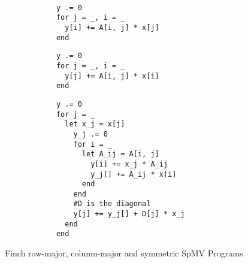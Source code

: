 \begin{wrapfigure}{r}{0.41\linewidth}
    \vspace{-36pt}
    \begin{minipage}[t]{0.18\textwidth}
        \begin{verbatim}
        
            y .= 0
            for j = _, i = _
              y[i] += A[i, j] * x[j]
            end
        \end{verbatim}
        \vspace{24pt} %
        \begin{verbatim}
            y .= 0
            for j = _, i = _
              y[j] += A[i, j] * x[i]
            end
        \end{verbatim}
    \end{minipage}\hfill%
    \begin{minipage}[t]{0.22\textwidth}
        \vspace{0pt} %
        \begin{verbatim}
            y .= 0
            for j = _
              let x_j = x[j]
                y_j .= 0
                for i = _
                  let A_ij = A[i, j]
                    y[i] += x_j * A_ij
                    y_j[] += A_ij * x[i]
                  end
                end
                #D is the diagonal
                y[j] += y_j[] + D[j] * x_j
              end
            end
        \end{verbatim}
    \end{minipage}
    \vspace{-12pt}
    \caption{Finch row-major, column-major and symmetric SpMV Programs}
    \label{spmv_programs}
    \vspace{-36pt}
  \end{wrapfigure}
